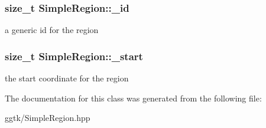 \subsubsection[{\texorpdfstring{\+\_\+id}{_id}}]{\setlength{\rightskip}{0pt plus 5cm}size\+\_\+t Simple\+Region\+::\+\_\+id}\hypertarget{classSimpleRegion_a397f3c8897d30259081e41ef9346745b}{}\label{classSimpleRegion_a397f3c8897d30259081e41ef9346745b}
a generic id for the region 
\subsubsection[{\texorpdfstring{\+\_\+start}{_start}}]{\setlength{\rightskip}{0pt plus 5cm}size\+\_\+t Simple\+Region\+::\+\_\+start}\hypertarget{classSimpleRegion_a24ee6f4ef0fc3ba2bfe9bc9eb8dfca60}{}\label{classSimpleRegion_a24ee6f4ef0fc3ba2bfe9bc9eb8dfca60}
the start coordinate for the region 

The documentation for this class was generated from the following file\+:\begin{DoxyCompactItemize}
\item 
ggtk/Simple\+Region.\+hpp\end{DoxyCompactItemize}
